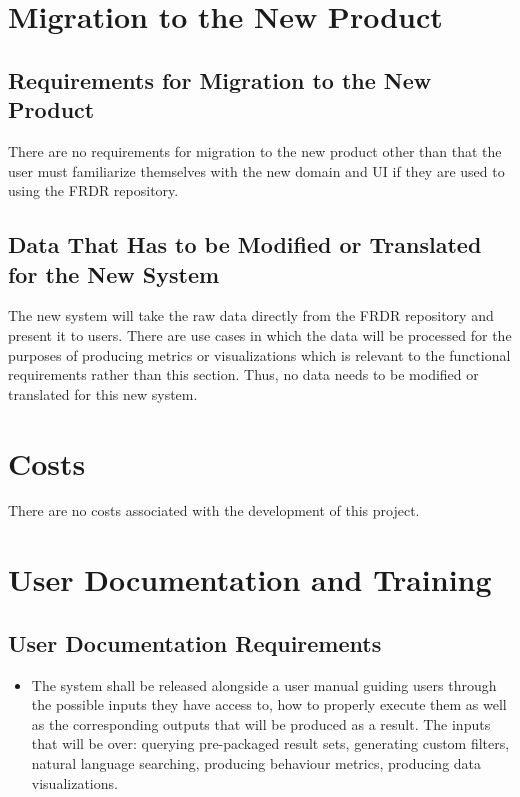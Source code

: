 \documentclass[12pt]{article}
\begin{document}
\section{Migration to the New Product}
\subsection{Requirements for Migration to the New Product}

\par{There are no requirements for migration to the new product other than that the user must familiarize themselves with the new domain and UI if they are used to using the FRDR repository.}


\subsection{Data That Has to be Modified or Translated for the New System}

\par{The new system will take the raw data directly from the FRDR repository and present it to users. There are use cases in which the data will be processed for the purposes 
     of producing metrics or visualizations which is relevant to the functional requirements rather than this section. Thus, no data needs to be modified or translated for this new system.}

\section{Costs}

\par{There are no costs associated with the development of this project.}

\section{User Documentation and Training}
\subsection{User Documentation Requirements}

\begin{itemize}
    \item The system shall be released alongside a user manual guiding users through the possible inputs they have access to, how to properly execute them as well as the corresponding outputs that will be produced as a result. The inputs that 
    will be over: querying pre-packaged result sets, generating custom filters, natural language searching, producing behaviour metrics, producing data visualizations.
\end{itemize}
\end{document}
